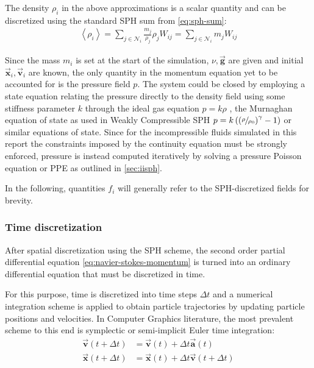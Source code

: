 \documentclass[oneside, a4paper]{book}
\newcommand\angled[1]{\left\langle#1\right\rangle}
\newcommand\vek[1]{\vec{\bm{#1}}}
\newcommand\br[1]{\left(#1\right)}
\begin{document}
    The density $\rho_i$ in the above approximations is a scalar quantity and can be discretized using the standard SPH sum from \autoref{eq:sph-sum}:
    \begin{align}\label{eq:discrete-density}
      \angled{\rho_i}  
      = \sum_{j\in\mathcal{N}_i} \frac{m_j}{\rho_j} \rho_j W_{ij} 
      = \sum_{j\in\mathcal{N}_i} m_j W_{ij} 
    \end{align}

    Since the mass $m_i$ is set at the start of the simulation, $\nu,\vek{g}$ are given and initial $\vek{x}_i, \vek{v}_i$ are known, the only quantity in the momentum equation yet to be accounted for is the pressure field $p$. The system could be closed by employing a state equation relating the pressure directly to the density field using some stiffness parameter $k$ through the ideal gas equation $p=k\rho$ \autocite{müller-2003}, the Murnaghan equation of state \autocite{murnaghan-eos} as used in Weakly Compressible SPH \autocite{wcsph} $p=k\br{\br{\sfrac{\rho}{\rho_0}}^\gamma-1}$ or similar equations of state. Since for the incompressible fluids simulated in this report the constraints imposed by the continuity equation must be strongly enforced, pressure is instead computed iteratively by solving a pressure Poisson equation or PPE as outlined in \autoref{sec:iisph}.

    In the following, quantities $f_i$ will generally refer to the SPH-discretized fields for brevity.

    \subsubsection{Time discretization}
    After spatial discretization using the SPH scheme, the second order partial differential equation \autoref{eq:navier-stokes-momentum} is turned into an ordinary differential equation \autocite{tutorial2019} that must be discretized in time. 

    For this purpose, time is discretized into time steps $\Delta t$ and a numerical integration scheme is applied to obtain particle trajectories by updating particle positions and velocities. In Computer Graphics literature, the most prevalent scheme \autocites{tutorial2019}{wcsph}{iisph}{iisph-flip}{dfsph} to this end is symplectic or semi-implicit Euler time integration:
    \begin{align}\label{eq:numerical-time-integration}
      \vek{v}(t+\Delta t) &= \vek{v}(t) + \Delta t \vek{a}(t)\\
      \vek{x}(t+\Delta t) &= \vek{x}(t) + \Delta t \vek{v}(t+\Delta t)
    \end{align}
\end{document}
